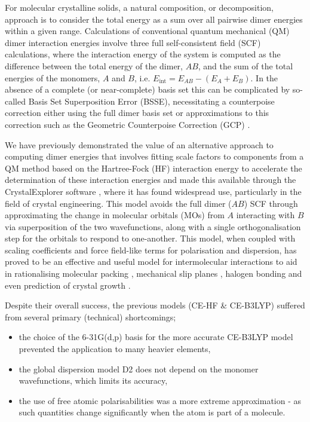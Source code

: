 \documentclass[preprint]{iucr}              %
\begin{document}
For molecular crystalline solids, a natural composition, or decomposition, approach is to consider the total energy as a sum over all pairwise dimer energies within a given range. Calculations of conventional quantum mechanical (QM) dimer interaction energies involve three full self-consistent field (SCF) calculations, where the
interaction energy of the system is computed as the difference between the total energy of the dimer, $AB$, and the sum 
of the total energies of the monomers, $A$ and $B$, i.e. $E_\textrm{int} = E_{AB} - (E_A + E_B)$.
In the absence of a complete (or near-complete) basis set this can be complicated by so-called Basis Set Superposition
Error (BSSE), necessitating a counterpoise correction either using the full dimer basis set \cite{Boys1970}
or approximations to this correction such as the Geometric Counterpoise Correction (GCP) \cite{Kruse2012}.

We have previously demonstrated the value of an alternative approach to computing dimer energies that involves fitting scale factors to components from a QM method based on the Hartree-Fock (HF)
interaction energy \cite{Su2009} to accelerate the determination of these interaction energies \cite{Turner2014,Mackenzie2017} and
made this available through the CrystalExplorer software \cite{Spackman2021}, where it has found widespread
use, particularly in the field of crystal engineering. This model avoids the full dimer ($AB$) SCF through approximating
the change in molecular orbitals (MOs) from $A$ interacting with $B$ via superposition of the two wavefunctions, along with
a single orthogonalisation step for the orbitals to respond to one-another. This model, when coupled with scaling coefficients
and force field-like terms for polarisation and dispersion, has proved to be an effective and useful model for
intermolecular interactions to aid in rationalising molecular packing \cite{Tan2019}, mechanical slip planes \cite{Wang2018}, halogen bonding \cite{Brammer2017} and even prediction of crystal growth \cite{Spackman2023}.

Despite their overall success, the previous models (CE-HF \& CE-B3LYP) suffered from several primary (technical) shortcomings;
\begin{itemize}
\item the choice of the 6-31G(d,p) basis for the more accurate CE-B3LYP model prevented the application to many heavier elements,
\item the global dispersion model D2 \cite{Grimme2006} does not depend on the monomer wavefunctions, which limits its accuracy,
\item the use of free atomic polarisabilities was a more extreme approximation - as such quantities change significantly when the atom is part of a molecule.
\end{itemize}
\end{document}
